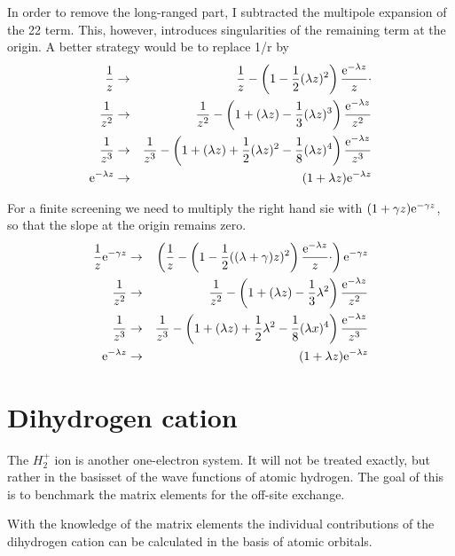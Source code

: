 \documentclass[11pt,a4paper]{report}
\begin{document}
In order to remove the long-ranged part, I subtracted the multipole
expansion of the 22 term. This, however, introduces singularities of
the remaining term at the origin. A better strategy would be to
replace 1/r by
\begin{eqnarray}
\frac{1}{z}&\rightarrow&
\frac{1}{z}-\left(1-\frac{1}{2}(\lambda z)^2\right)\frac{\mathrm{e}^{-\lambda z}}{z}\cdot
\nonumber\\
\frac{1}{z^2}&\rightarrow&\frac{1}{z^2}-
\left(1+(\lambda z)-\frac{1}{3}(\lambda z)^3\right)\frac{\mathrm{e}^{-\lambda z}}{z^2}
\nonumber\\
\frac{1}{z^3}&\rightarrow&\frac{1}{z^3}-
\left(1+(\lambda z)+\frac{1}{2}(\lambda z)^2 
-\frac{1}{8}(\lambda z)^4\right)\frac{\mathrm{e}^{-\lambda z}}{z^3}
\nonumber\\
\mathrm{e}^{-\lambda z}&\rightarrow&(1+\lambda z)\mathrm{e}^{-\lambda z}
\end{eqnarray}

For a finite screening we need to multiply the right hand sie with
$(1+\gamma z)\mathrm{e}^{-\gamma z}$, so that the slope at the origin remains
zero.
\begin{eqnarray}
\frac{1}{z}\mathrm{e}^{-\gamma z}&\rightarrow&
\left(
\frac{1}{z}
-\left(1-\frac{1}{2}((\lambda+\gamma) z)^2\right)\frac{\mathrm{e}^{-\lambda z}}{z}\cdot
\right)\mathrm{e}^{-\gamma z}
\nonumber\\
\frac{1}{z^2}&\rightarrow&\frac{1}{z^2}-
\left(1+(\lambda z)-\frac{1}{3}\lambda^2\right)\frac{\mathrm{e}^{-\lambda z}}{z^2}
\nonumber\\
\frac{1}{z^3}&\rightarrow&\frac{1}{z^3}-
\left(1+(\lambda z)+\frac{1}{2}\lambda^2-\frac{1}{8}(\lambda x)^4\right)\frac{\mathrm{e}^{-\lambda z}}{z^3}
\nonumber\\
\mathrm{e}^{-\lambda z}&\rightarrow&(1+\lambda z)\mathrm{e}^{-\lambda z}
\end{eqnarray}

\section{Dihydrogen cation}
\label{sec:exacth2plus}
The $H_2^+$ ion is another one-electron system. It will not be treated
exactly, but rather in the basisset of the wave functions of atomic
hydrogen. The goal of this is to benchmark the matrix elements for the
off-site exchange.

With the knowledge of the matrix elements the individual contributions
of the dihydrogen cation can be calculated in the basis of atomic
orbitals.
\end{document}
